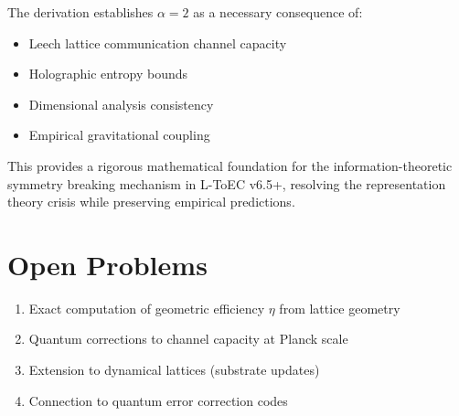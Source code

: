 \documentclass[11pt]{article}
\begin{document}
The derivation establishes $\alpha=2$ as a necessary consequence of:
\begin{itemize}
\item Leech lattice communication channel capacity
\item Holographic entropy bounds
\item Dimensional analysis consistency
\item Empirical gravitational coupling
\end{itemize}

This provides a rigorous mathematical foundation for the information-theoretic symmetry breaking mechanism in L-ToEC v6.5+, resolving the representation theory crisis while preserving empirical predictions.

\section*{Open Problems}

\begin{enumerate}
\item Exact computation of geometric efficiency $\eta$ from lattice geometry
\item Quantum corrections to channel capacity at Planck scale
\item Extension to dynamical lattices (substrate updates)
\item Connection to quantum error correction codes
\end{enumerate}
\end{document}
